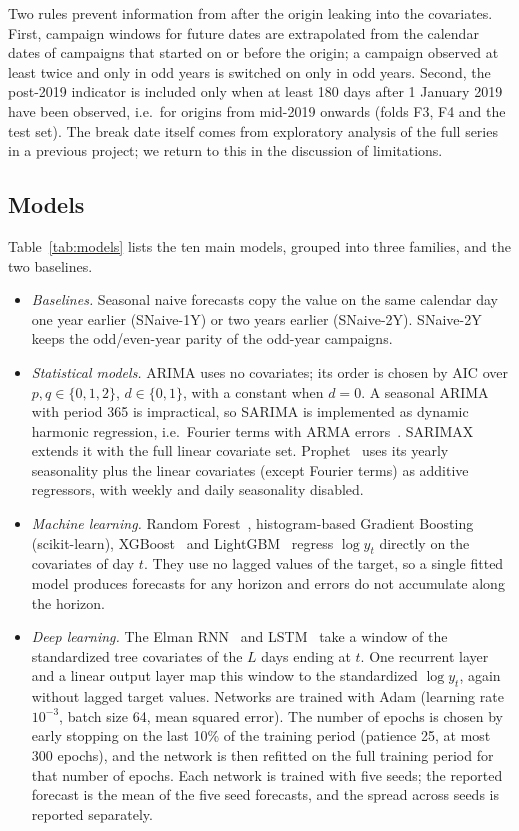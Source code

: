 \documentclass[conference]{IEEEtran}
\begin{document}
Two rules prevent information from after the origin leaking into the covariates.
First, campaign windows for future dates are extrapolated from the calendar dates of campaigns that started on or before the origin; a campaign observed at least twice and only in odd years is switched on only in odd years.
Second, the post-2019 indicator is included only when at least 180 days after 1 January 2019 have been observed, i.e.\ for origins from mid-2019 onwards (folds F3, F4 and the test set).
The break date itself comes from exploratory analysis of the full series in a previous project; we return to this in the discussion of limitations.

\subsection{Models}
Table~\ref{tab:models} lists the ten main models, grouped into three families, and the two baselines.
\begin{itemize}
\item \emph{Baselines.} Seasonal naive forecasts copy the value on the same calendar day one year earlier (SNaive-1Y) or two years earlier (SNaive-2Y). SNaive-2Y keeps the odd/even-year parity of the odd-year campaigns.
\item \emph{Statistical models.} ARIMA uses no covariates; its order is chosen by AIC over $p,q\in\{0,1,2\}$, $d\in\{0,1\}$, with a constant when $d=0$. A seasonal ARIMA with period 365 is impractical, so SARIMA is implemented as dynamic harmonic regression, i.e.\ Fourier terms with ARMA errors~\cite{hyndman2021fpp3}. SARIMAX extends it with the full linear covariate set. Prophet~\cite{taylor2018prophet} uses its yearly seasonality plus the linear covariates (except Fourier terms) as additive regressors, with weekly and daily seasonality disabled.
\item \emph{Machine learning.} Random Forest~\cite{breiman2001rf}, histogram-based Gradient Boosting~\cite{friedman2001gbm} (scikit-learn), XGBoost~\cite{chen2016xgboost} and LightGBM~\cite{ke2017lightgbm} regress $\log y_t$ directly on the covariates of day $t$. They use no lagged values of the target, so a single fitted model produces forecasts for any horizon and errors do not accumulate along the horizon.
\item \emph{Deep learning.} The Elman RNN~\cite{elman1990rnn} and LSTM~\cite{hochreiter1997lstm} take a window of the standardized tree covariates of the $L$ days ending at $t$. One recurrent layer and a linear output layer map this window to the standardized $\log y_t$, again without lagged target values. Networks are trained with Adam (learning rate $10^{-3}$, batch size 64, mean squared error). The number of epochs is chosen by early stopping on the last 10\% of the training period (patience 25, at most 300 epochs), and the network is then refitted on the full training period for that number of epochs. Each network is trained with five seeds; the reported forecast is the mean of the five seed forecasts, and the spread across seeds is reported separately.
\end{itemize}
\end{document}
